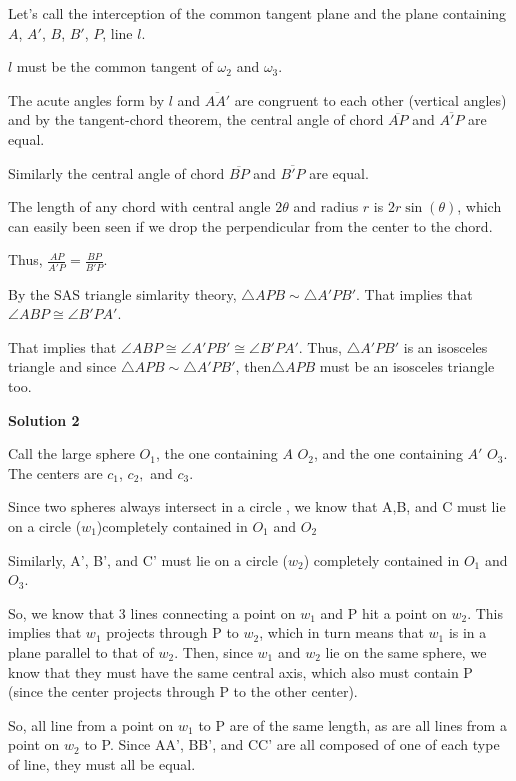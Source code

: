 \begin{enumerate}
 


 Let's call the interception of the common tangent plane and the plane containing $A$, $A'$, $B$, $B'$, $P$, line $l$.

 $l$ must be the common tangent of $\omega_2$ and $\omega_3$.

 The acute angles form by $l$ and $\overline{AA'}$ are congruent to each other (vertical angles) and by the tangent-chord theorem, the central angle of chord $\overline{AP}$ and $\overline{A'P}$ are equal.

 Similarly the central angle of chord $\overline{BP}$ and $\overline{B'P}$ are equal.

 The length of any chord with central angle $2\theta$ and radius $r$ is $2r\sin\left({\theta}\right)$, which can easily been seen if we drop the perpendicular from the center to the chord.

 Thus, $\frac{AP}{A'P}=\frac{BP}{B'P}$.

 By the SAS triangle simlarity theory, $\triangle APB \sim\triangle A'PB'$. That implies that $\angle ABP\cong\angle B'PA'$.

 
That implies that $\angle ABP\cong\angle A'PB'\cong\angle B'PA'$. Thus, $\triangle A'PB'$ is an isosceles triangle and since $\triangle APB \sim\triangle A'PB'$, then$\triangle APB$ must be an isosceles triangle too.

 



\textbf{Solution 2}

Call the large sphere $O_1$, the one containing $A$ $O_2$, and the one containing $A'$ $O_3$.  The centers are $c_1$, $c_2,$ and $c_3$.

 
Since two spheres always intersect in a circle , we know that A,B, and C must lie on a circle ($w_1$)completely contained in $O_1$ and $O_2$

 
Similarly, A', B', and C' must lie on a circle ($w_2$) completely contained in $O_1$ and $O_3$.  

 
So, we know that 3 lines connecting a point on $w_1$ and P hit a point on $w_2$.  This implies that $w_1$ projects through P to $w_2$, which in turn means that $w_1$ is in a plane parallel to that of $w_2$.  Then, since $w_1$ and $w_2$ lie on the same sphere, we know that they must have the same central axis, which also must contain P (since the center projects through P to the other center).  

 
So, all line from a point on $w_1$ to P are of the same length, as are all lines from a point on $w_2$ to P.  Since AA', BB', and CC' are all composed of one of each type of line, they must all be equal.


\end{enumerate}
